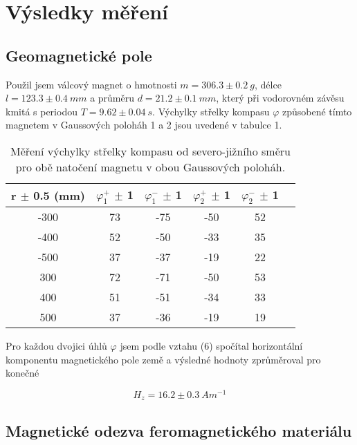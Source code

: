 \documentclass[a4paper,11pt]{article}
\begin{document}
\newpage


\section{Výsledky měření}

\subsection{Geomagnetické pole}

Použil jsem válcový magnet o hmotnosti $ m = 306.3 \pm 0.2\ g $, délce $ l = 123.3 \pm 0.4\ mm $ a průměru $ d = 21.2 \pm 0.1\ mm $, který při vodorovném závěsu kmitá s periodou $ T = 9.62 \pm 0.04\ s $. Výchylky střelky kompasu $\varphi$ způsobené tímto magnetem v Gaussových poloháh 1 a 2 jsou uvedené v tabulce 1.

\begin{table}[htpb]
  \centering
   \begin{tabular}{ | c | c | c | c | c |  c |}
       \hline
       r $\pm$ 0.5 (mm) & \( \varphi_1^+ \) $\pm$ 1 & \( \varphi_1^- \) $\pm$ 1& \( \varphi_2^+ \) $\pm$ 1& \( \varphi_2^- \) $\pm$ 1 \\
       \hline
       -300  & 73 & -75 & -50 & 52 \\
       -400 & 52 & -50 & -33 & 35 \\
       -500 & 37 & -37 & -19 & 22 \\
       300  & 72 & -71 & -50 & 53 \\ 
       400  & 51 & -51 & -34 & 33 \\
       500  & 37 & -36 & -19 & 19 \\    
       \hline
   \end{tabular}
   \caption{Měření výchylky střelky kompasu od severo-jižního směru pro obě natočení magnetu v obou Gaussových poloháh.}
\end{table}

Pro každou dvojici úhlů $ \varphi $ jsem podle vztahu (6) spočítal horizontální komponentu magnetického pole země a výsledné hodnoty zprůměroval pro konečné

\begin{equation}
H_z = 16.2  \pm 0.3 \ Am^{-1}
\end{equation}

\subsection{Magnetické odezva feromagnetického materiálu}
\end{document}

